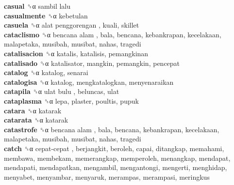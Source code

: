\textbf{casual} ␝α   sambil lalu   \\
\textbf{casualmente} ␝α  kebetulan  \\
\textbf{casuela} ␝α   alat penggorengan , kuali, skillet  \\
\textbf{cataclismo} ␝α   bencana alam , bala, bencana, kebankrapan, kecelakaan, malapetaka, musibah, musibat, nahas, tragedi  \\
\textbf{catalisacion} ␝α  katalis, katalisis, pemangkinan  \\
\textbf{catalisado} ␝α  katalisator, mangkin, pemangkin, pencepat  \\
\textbf{catalog} ␝α  katalog, senarai  \\
\textbf{catalogisa} ␝α  katalog, mengkatalogkan, menyenaraikan  \\
\textbf{catapila} ␝α   ulat bulu , beluncas, ulat  \\
\textbf{cataplasma} ␝α  lepa, plaster, poultis, pupuk  \\
\textbf{catara} ␝α  katarak  \\
\textbf{catarata} ␝α  katarak  \\
\textbf{catastrofe} ␝α   bencana alam , bala, bencana, kebankrapan, kecelakaan, malapetaka, musibah, musibat, nahas, tragedi  \\
\textbf{catch} ␝α   cepat-cepat , berjangkit, beroleh, capai, ditangkap, memahami, membawa, membekam, memerangkap, memperoleh, menangkap, mendapat, mendapati, mendapatkan, mengambil, mengantongi, mengerti, menghidap, menyabet, menyambar, menyaruk, merampas, merampasi, meringkus  \\
